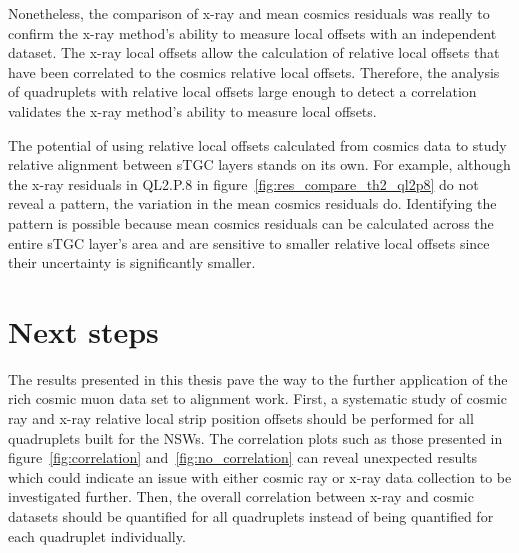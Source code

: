 Nonetheless, the comparison of x-ray and mean cosmics residuals was really to confirm the x-ray method's ability to measure local offsets with an independent dataset. The x-ray local offsets allow the calculation of relative local offsets that have been correlated to the cosmics relative local offsets. Therefore, the analysis of quadruplets with relative local offsets large enough to detect a correlation validates the x-ray method's ability to measure local offsets. 

The potential of using relative local offsets calculated from cosmics data to study relative alignment between sTGC layers stands on its own. For example, although the x-ray residuals in QL2.P.8 in figure~\ref{fig:res_compare_th2_ql2p8} do not reveal a pattern, the variation in the mean cosmics residuals do. Identifying the pattern is possible because mean cosmics residuals can be calculated across the entire sTGC layer's area and are sensitive to smaller relative local offsets since their uncertainty is significantly smaller. 


\section{Next steps}

The results presented in this thesis pave the way to the further application of the rich cosmic muon data set to alignment work. First, a systematic study of cosmic ray and x-ray relative local strip position offsets should be performed for all quadruplets built for the NSWs. The correlation plots such as those presented in figure~\ref{fig:correlation} and~\ref{fig:no_correlation} can reveal unexpected results which could indicate an issue with either cosmic ray or x-ray data collection to be investigated further. Then, the overall correlation between x-ray and cosmic datasets should be quantified for all quadruplets instead of being quantified for each quadruplet individually.
 
